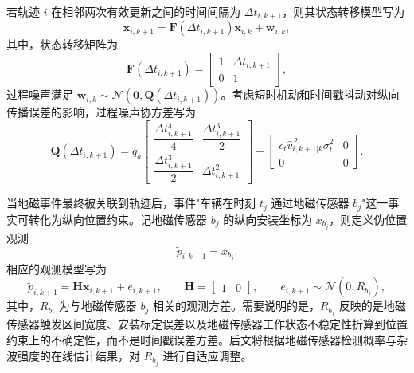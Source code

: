 \documentclass{xdupgthesis}
\begin{document}
若轨迹 $i$ 在相邻两次有效更新之间的时间间隔为 $\Delta t_{i,k+1}$，则其状态转移模型写为
\begin{equation}
	\mathbf x_{i,k+1}=
	\mathbf F\left(\Delta t_{i,k+1}\right)\mathbf x_{i,k}+\mathbf w_{i,k},
	\label{eq:ch3_state_transition}
\end{equation}
其中，状态转移矩阵为
\begin{equation}
	\mathbf F\left(\Delta t_{i,k+1}\right)=
	\begin{bmatrix}
		1 & \Delta t_{i,k+1}\\
		0 & 1
	\end{bmatrix},
	\label{eq:ch3_F}
\end{equation}
过程噪声满足 $\mathbf w_{i,k}\sim\mathcal N(\mathbf 0,\mathbf Q(\Delta t_{i,k+1}))$。考虑短时机动和时间戳抖动对纵向传播误差的影响，过程噪声协方差写为
\begin{equation}
	\mathbf Q\left(\Delta t_{i,k+1}\right)
	=
	q_a
	\begin{bmatrix}
		\dfrac{\Delta t_{i,k+1}^{4}}{4} & \dfrac{\Delta t_{i,k+1}^{3}}{2}\\[6pt]
		\dfrac{\Delta t_{i,k+1}^{3}}{2} & \Delta t_{i,k+1}^{2}
	\end{bmatrix}
	+
	\begin{bmatrix}
		c_t \hat v_{i,k+1|k}^{\,2}\sigma_t^2 & 0\\
		0 & 0
	\end{bmatrix}.
	\label{eq:ch3_Q}
\end{equation}

当地磁事件最终被关联到轨迹后，事件"车辆在时刻 $t_j$ 通过地磁传感器 $b_j$"这一事实可转化为纵向位置约束。记地磁传感器 $b_j$ 的纵向安装坐标为 $x_{b_j}$，则定义伪位置观测
\begin{equation}
	\tilde p_{i,k+1}=x_{b_j}.
	\label{eq:ch3_pseudo_meas}
\end{equation}
相应的观测模型写为
\begin{equation}
	\tilde p_{i,k+1}=\mathbf H\mathbf x_{i,k+1}+e_{i,k+1},
	\qquad
	\mathbf H=
	\begin{bmatrix}
		1 & 0
	\end{bmatrix},
	\qquad
	e_{i,k+1}\sim\mathcal N(0,R_{b_j}),
	\label{eq:ch3_measurement_k}
\end{equation}
其中，$R_{b_j}$ 为与地磁传感器 $b_j$ 相关的观测方差。需要说明的是，$R_{b_j}$ 反映的是地磁传感器触发区间宽度、安装标定误差以及地磁传感器工作状态不稳定性折算到位置约束上的不确定性，而不是时间戳误差方差。后文将根据地磁传感器检测概率与杂波强度的在线估计结果，对 $R_{b_j}$ 进行自适应调整。
\end{document}
